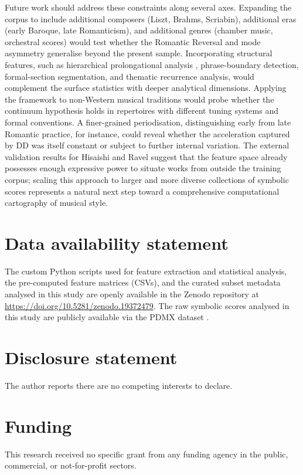 \documentclass[]{interact}
\newif\ifblindreview
\theoremstyle{plain}
\theoremstyle{definition}
\theoremstyle{remark}
\begin{document}
Future work should address these constraints along several axes. Expanding
the corpus to include additional composers (Liszt, Brahms, Scriabin),
additional eras (early Baroque, late Romanticism), and additional genres
(chamber music, orchestral scores) would test whether the Romantic
Reversal and mode asymmetry generalise beyond the present sample.
Incorporating structural features, such as hierarchical
prolongational analysis \citep{KirlinUtgoff2008}, phrase-boundary detection,
formal-section segmentation, and thematic recurrence analysis, would
complement the surface statistics with deeper analytical dimensions. Applying the framework to non-Western musical
traditions would probe whether the continuum hypothesis holds in
repertoires with different tuning systems and formal conventions. A
finer-grained periodisation, distinguishing early from late Romantic
practice, for instance, could reveal whether the acceleration captured
by DD was itself constant or subject to further internal variation. The
external validation results for Hisaishi and Ravel suggest that the
feature space already possesses enough expressive power to situate
works from outside the training corpus; scaling this approach to larger
and more diverse collections of symbolic scores represents a natural
next step toward a comprehensive computational cartography of musical
style.

\section*{Data availability statement}
The custom Python scripts used for feature extraction and statistical analysis, the pre-computed feature matrices (CSVs), and the curated subset metadata analysed in this study are openly available in the Zenodo repository at \ifblindreview [DOI link redacted for double-blind review] \else \url{https://doi.org/10.5281/zenodo.19372479}\fi. The raw symbolic scores analysed in this study are publicly available via the PDMX dataset \citep{PDMX2024}.

\section*{Disclosure statement}
The author reports there are no competing interests to declare.

\section*{Funding}
This research received no specific grant from any funding agency in the public, commercial, or not-for-profit sectors.



\end{document}
